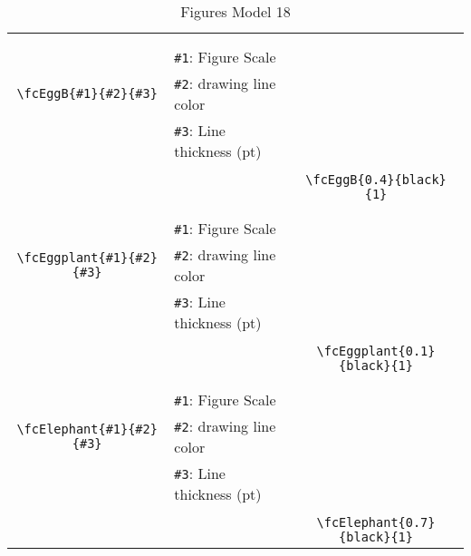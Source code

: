 \documentclass[x11names]{article}
\begin{document}
\begin{table}[H]
\begin{tabular}{|c|l|c|}
	&&\multirow{5}{*}{\fcEggB{0.4}{black}{1}}\\	&&\\	&\verb|#1|: Figure Scale &\\	\verb|\fcEggB{#1}{#2}{#3}|&	\verb|#2|: drawing line color &\\	&\verb|#3|: Line thickness (pt) &\\ &&\\&&	\verb|\fcEggB{0.4}{black}{1}|\\\hline 	
	&&\multirow{5}{*}{\fcEggplant{0.1}{black}{1}}\\	&&\\	&\verb|#1|: Figure Scale &\\	\verb|\fcEggplant{#1}{#2}{#3}|&	\verb|#2|: drawing line color &\\	&\verb|#3|: Line thickness (pt) &\\ &&\\&&	\verb|\fcEggplant{0.1}{black}{1}|\\\hline 	
	&&\multirow{5}{*}{\fcElephant{0.7}{black}{1}}\\	&&\\	&\verb|#1|: Figure Scale &\\	\verb|\fcElephant{#1}{#2}{#3}|&	\verb|#2|: drawing line color &\\	&\verb|#3|: Line thickness (pt) &\\ &&\\&&	\verb|\fcElephant{0.7}{black}{1}|\\\hline 	\hline\end{tabular}\caption{Figures Model 18}\label{tab18}\end{table}
\end{document}
